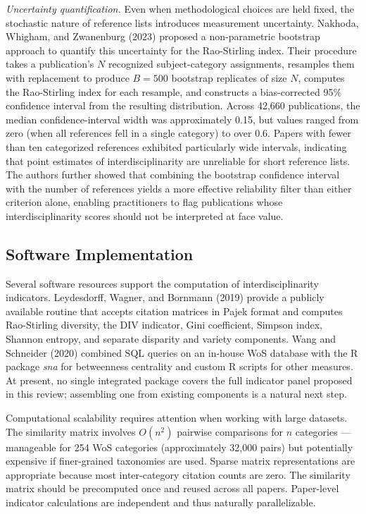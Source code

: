 \documentclass[
]{article}
\begin{document}
\emph{Uncertainty quantification.} Even when methodological choices are
held fixed, the stochastic nature of reference lists introduces
measurement uncertainty. Nakhoda, Whigham, and Zwanenburg (2023)
proposed a non-parametric bootstrap approach to quantify this
uncertainty for the Rao-Stirling index. Their procedure takes a
publication's \(N\) recognized subject-category assignments, resamples
them with replacement to produce \(B = 500\) bootstrap replicates of
size \(N\), computes the Rao-Stirling index for each resample, and
constructs a bias-corrected 95\% confidence interval from the resulting
distribution. Across 42,660 publications, the median confidence-interval
width was approximately 0.15, but values ranged from zero (when all
references fell in a single category) to over 0.6. Papers with fewer
than ten categorized references exhibited particularly wide intervals,
indicating that point estimates of interdisciplinarity are unreliable
for short reference lists. The authors further showed that combining the
bootstrap confidence interval with the number of references yields a
more effective reliability filter than either criterion alone, enabling
practitioners to flag publications whose interdisciplinarity scores
should not be interpreted at face value.

\hypertarget{software-implementation}{%
\subsection{Software Implementation}\label{software-implementation}}

Several software resources support the computation of
interdisciplinarity indicators. Leydesdorff, Wagner, and Bornmann (2019)
provide a publicly available routine that accepts citation matrices in
Pajek format and computes Rao-Stirling diversity, the DIV indicator,
Gini coefficient, Simpson index, Shannon entropy, and separate disparity
and variety components. Wang and Schneider (2020) combined SQL queries
on an in-house WoS database with the R package \emph{sna} for
betweenness centrality and custom R scripts for other measures. At
present, no single integrated package covers the full indicator panel
proposed in this review; assembling one from existing components is a
natural next step.

Computational scalability requires attention when working with large
datasets. The similarity matrix involves \(O(n^2)\) pairwise comparisons
for \(n\) categories --- manageable for 254 WoS categories
(approximately 32,000 pairs) but potentially expensive if finer-grained
taxonomies are used. Sparse matrix representations are appropriate
because most inter-category citation counts are zero. The similarity
matrix should be precomputed once and reused across all papers.
Paper-level indicator calculations are independent and thus naturally
parallelizable.
\end{document}
